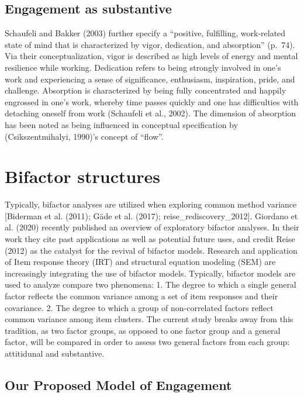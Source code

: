 \documentclass[
  man]{apa6}
\begin{document}
\hypertarget{engagement-as-substantive}{%
\subsection{Engagement as substantive}\label{engagement-as-substantive}}

Schaufeli and Bakker (2003) further specify a ``positive, fulfilling, work-related state of mind that is characterized by vigor, dedication, and absorption'' (p.~74). Via their conceptualization, vigor is described as high levels of energy and mental resilience while working. Dedication refers to being strongly involved in one's work and experiencing a sense of significance, enthusiasm, inspiration, pride, and challenge. Absorption is characterized by being fully concentrated and happily engrossed in one's work, whereby time passes quickly and one has difficulties with detaching oneself from work (Schaufeli et al., 2002). The dimension of absorption has been noted as being influenced in conceptual specification by (Csikszentmihalyi, 1990)'s concept of ``flow''.

\hypertarget{bifactor-structures}{%
\section{Bifactor structures}\label{bifactor-structures}}

Typically, bifactor analyses are utilized when exploring common method variance {[}Biderman et al. (2011); Gäde et al. (2017); reise\_rediscovery\_2012{]}. Giordano et al. (2020) recently published an overview of exploratory bifactor analyses. In their work they cite past applications as well as potential future uses, and credit Reise (2012) as the catalyst for the revival of bifactor models. Research and application of Item response theory (IRT) and structural equation modeling (SEM) are increasingly integrating the use of bifactor models. Typically, bifactor models are used to analyze compare two phenomena:
1. The degree to which a single general factor reflects the common variance among a set of item responses and their covariance.
2. The degree to which a group of non-correlated factors reflect common variance among item clusters.
The current study breaks away from this tradition, as two factor groups, as opposed to one factor group and a general factor, will be compared in order to assess two general factors from each group: attitidunal and substantive.

\hypertarget{our-proposed-model-of-engagement}{%
\subsection{Our Proposed Model of Engagement}\label{our-proposed-model-of-engagement}}
\end{document}
